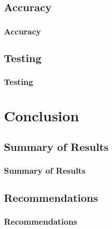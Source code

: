 \documentclass{beamer}
\begin{document}
\subsection{Accuracy}
\begin{frame}
\frametitle{Accuracy}
\end{frame}

\subsection{Testing}
\begin{frame}
\frametitle{Testing}
\end{frame}

\section{Conclusion}
\subsection{Summary of Results}
\begin{frame}
\frametitle{Summary of Results}
\end{frame}

\subsection{Recommendations}
\begin{frame}
\frametitle{Recommendations}
\end{frame}
\end{document}
